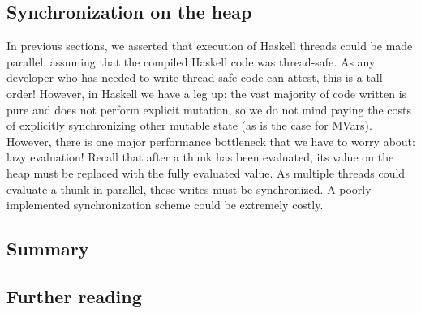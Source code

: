 
\subsection{Synchronization on the heap}

In previous sections, we asserted that execution of Haskell threads
could be made parallel, assuming that the compiled Haskell code was
thread-safe.  As any developer who has needed to write thread-safe code
can attest, this is a tall order!  However, in Haskell we have a leg up:
the vast majority of code written is pure and does not perform explicit
mutation, so we do not mind paying the costs of explicitly synchronizing
other mutable state (as is the case for MVars). However, there is one
major performance bottleneck that we have to worry about: lazy
evaluation!  Recall that after a thunk has been evaluated, its value on
the heap must be replaced with the fully evaluated value.  As multiple
threads could evaluate a thunk in parallel, these writes must be
synchronized. A poorly implemented synchronization scheme could be
extremely costly.


\subsection{Summary}

\subsection{Further reading}
